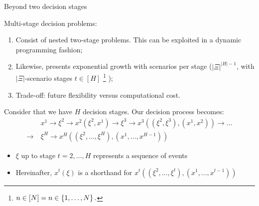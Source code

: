 \begin{frame}{Beyond two decision stages} 

	\alert{Multi-stage} decision problems:
	\vspace{-6pt}
	\begin{enumerate}
		\item Consist of \alert{nested two-stage problems}. This can be exploited in a \alert{dynamic programming} fashion;
		\item Likewise, presents \alert{exponential growth} with scenarios per stage ($|\Xi|^{|H|-1}$, with $|\Xi|$-scenario stages $t \in [H]$%
		\footnote{$n \in [N] = n \in \left\{ 1,\dots,N \right \}.$}
		);
		\item Trade-off: future \alert{flexibility} versus computational cost.	
	\end{enumerate}
	
	\pause
	Consider that we have $H$ decision stages. Our decision process becomes:
	\begin{align*}
		& x^1 \rightarrow \xi^2 \rightarrow x^2(\xi^2,x^1)
	 	 \rightarrow \xi^3
	 	 \rightarrow x^3((\xi^2,\xi^3), (x^1,x^2)) \rightarrow \dots \\\rightarrow 	
	 	 ~& \xi^H \rightarrow x^H((\xi^2,\dots,\xi^H), (x^1,\dots,x^{H-1}))
	\end{align*}
	
	\vspace{-6pt}	
	\begin{itemize}
		\item $\xi$ up to stage $t= 2, \dots, H$ represents a \alert{sequence} of events
		\item Hereinafter, $x^t(\xi)$ is a shorthand for $x^t((\xi^2,\dots,\xi^t), (x^1,\dots,x^{t-1}))$ \vspace{6pt}	
	\end{itemize}
	 

\end{frame}

